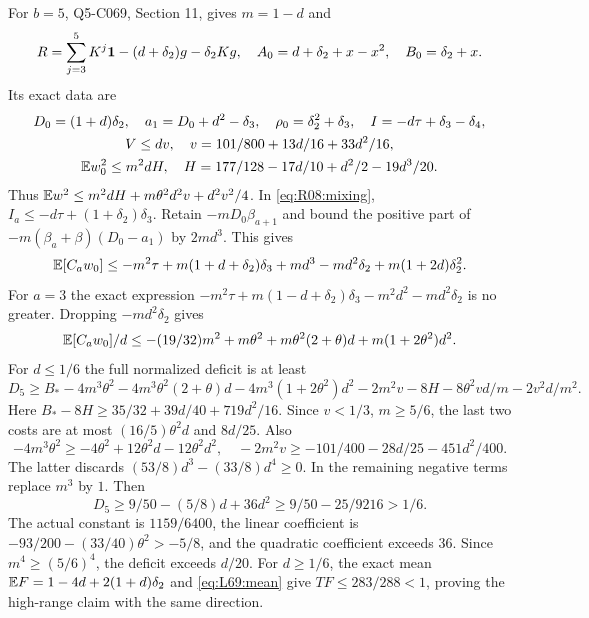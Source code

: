 For $b=5$, Q5-C069, Section 11, gives $m=1-d$ and
\[
 R=\sum_{j=3}^5K^j\mathbf1-(d+\delta_2)g-\delta_2Kg,
 \quad A_0=d+\delta_2+x-x^2,\quad B_0=\delta_2+x.
\]
Its exact data are
\[
\begin{gathered}
D_0=(1+d)\delta_2,\quad a_1=D_0+d^2-\delta_3,\quad
\rho_0=\delta_2^2+\delta_3,\quad I=-d\tau+\delta_3-\delta_4,\\
V\le dv,\quad v=101/800+13d/16+33d^2/16,\\
\mathbb E w_0^2\le m^2dH,\quad H=177/128-17d/10+d^2/2-19d^3/20.
\end{gathered}
\]
Thus $\mathbb E w^2\le m^2dH+m\theta^2d^2v+d^2v^2/4$.
In \eqref{eq:R08:mixing}, $I_a\le-d\tau+(1+\delta_2)\delta_3$.
Retain $-mD_0\beta_{a+1}$ and bound the positive part of
$-m(\beta_a+\beta)(D_0-a_1)$ by $2md^3$. This gives
\[
\mathbb E[C_aw_0]\le-m^2\tau+m(1+d+\delta_2)\delta_3+md^3
-md^2\delta_2+m(1+2d)\delta_2^2.
\]
For $a=3$ the exact expression
$-m^2\tau+m(1-d+\delta_2)\delta_3-m^2d^2-md^2\delta_2$
is no greater. Dropping $-md^2\delta_2$ gives
\[
 \mathbb E[C_aw_0]/d\le-(19/32)m^2+m\theta^2
 +m\theta^2(2+\theta)d+m(1+2\theta^2)d^2.
\]
For $d\le1/6$ the full normalized deficit is at least
\[
D_5\ge B_*-4m^3\theta^2-4m^3\theta^2(2+\theta)d
-4m^3(1+2\theta^2)d^2-2m^2v-8H
-8\theta^2vd/m-2v^2d/m^2.
\]
Here $B_*-8H\ge35/32+39d/40+719d^2/16$.
Since $v<1/3$, $m\ge5/6$, the last two costs are at most
$(16/5)\theta^2d$ and $8d/25$. Also
\[
-4m^3\theta^2\ge-4\theta^2+12\theta^2d-12\theta^2d^2,
\quad-2m^2v\ge-101/400-28d/25-451d^2/400.
\]
The latter discards $(53/8)d^3-(33/8)d^4\ge0$.
In the remaining negative terms replace $m^3$ by $1$. Then
\[
D_5\ge9/50-(5/8)d+36d^2\ge9/50-25/9216>1/6.
\]
The actual constant is $1159/6400$, the linear coefficient is
$-93/200-(33/40)\theta^2>-5/8$, and the quadratic coefficient exceeds
$36$. Since $m^4\ge(5/6)^4$, the deficit exceeds $d/20$.
For $d\ge1/6$, the exact mean
$\mathbb E F=1-4d+2(1+d)\delta_2$ and \eqref{eq:L69:mean} give
$TF\le283/288<1$, proving the high-range claim with the same direction.

